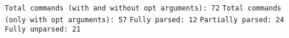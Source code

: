 \texttt{Total commands (with and without opt arguments): 72}\newline
\texttt{Total commands (only with opt arguments): 57}\newline
\texttt{Fully parsed: 12}\newline
\texttt{Partially parsed: 24}\newline
\texttt{Fully unparsed: 21}\newline
